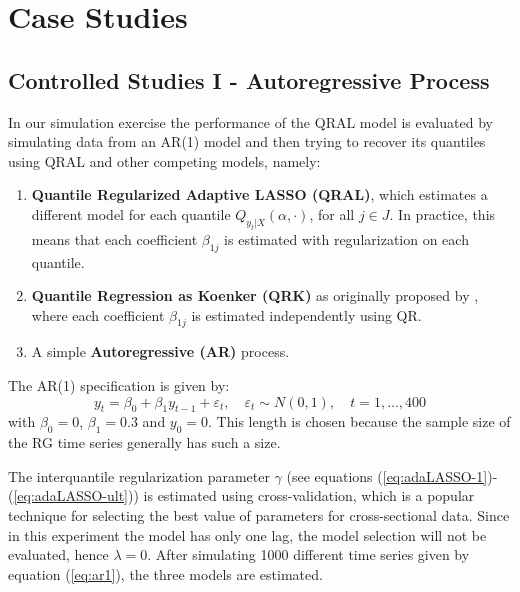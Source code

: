 \section{Case Studies}


\subsection{Controlled Studies I - Autoregressive Process} \label{sec:ar-study}


In our simulation exercise the performance of the QRAL model is evaluated by simulating data from an AR(1) model and then trying to recover its quantiles using QRAL and other competing models, namely:
\begin{enumerate}
\item \textbf{Quantile Regularized Adaptive LASSO (QRAL)}, which estimates a different model for each quantile $Q_{y_t|X}(\alpha,\cdot)$, for all ${j \in J}$. In practice, this means that each coefficient $\beta_{1j}$ is estimated with regularization on each quantile. %
\item \textbf{Quantile Regression as Koenker (QRK)} as originally proposed by \cite{koenker1978regression}, where each coefficient $\beta_{1j}$ is estimated independently using QR. 
\item A simple \textbf{Autoregressive (AR)} process.
\end{enumerate}

The AR(1) specification is given by:
\begin{equation}
y_t = \beta_0 + \beta_1 y_{t-1} + \varepsilon_t, \quad \varepsilon_t \sim N(0, 1), \quad t=1,\dots,400 \label{eq:ar1}
\end{equation}
with $\beta_0 = 0$, $\beta_1 = 0.3$ and $y_0 = 0$. This length is chosen because the sample size of the RG time series generally has such a size.

The interquantile regularization parameter $\gamma$ (see equations (\ref{eq:adaLASSO-1})-(\ref{eq:adaLASSO-ult})) is estimated using cross-validation, which is a popular technique for selecting the best value of parameters for cross-sectional data. 
Since in this experiment the model has only one lag, the model selection will not be evaluated, hence $\lambda=0$.
After simulating 1000 different time series given by equation (\ref{eq:ar1}), the three models are estimated.

